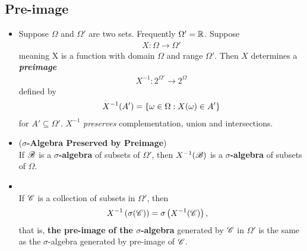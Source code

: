 \documentclass[11pt]{article}
\begin{document}
\subsection{Pre-image}
\begin{itemize}
\item \begin{remark}
Suppose $\Omega$ and $\Omega'$ are two sets. Frequently $\Omega' = {\mathbb R}$. Suppose
\begin{align*}
X: \Omega \rightarrow \Omega'
\end{align*}
meaning X is a function with domain $\Omega$ and range $\Omega'$. Then $X$ determines a \emph{\textbf{preimage}}
\begin{align*}
X^{-1}: 2^{\Omega'} \rightarrow 2^{\Omega}
\end{align*}
defined by
\begin{align*}
X^{-1}(A') = \left\{\omega \in \Omega: X(\omega) \in A'\right\}
\end{align*}
for $A' \subseteq \Omega'$. $X^{-1}$ \emph{preserves} complementation, union and intersections.
\end{remark}

\item \begin{proposition} (\textbf{$\sigma$-Algebra Preserved by Preimage}) \citep{resnick2013probability}\\
If ${\mathscr B}$ is a \textbf{$\sigma$-algebra} of subsets of $\Omega'$, then $X^{-1}({\mathscr B})$ is a \textbf{$\sigma$-algebra} of subsets of $\Omega$.
\end{proposition}

\item \begin{proposition}  \citep{resnick2013probability}\\
If ${\mathscr C}$ is a collection of subsets in $\Omega'$, then 
\begin{align*}
X^{-1}\left(\sigma({\mathscr C})\right) &= \sigma\left(X^{-1}({\mathscr C})\right),
\end{align*}
that is, \textbf{the pre-image of the $\sigma$-algebra} generated by ${\mathscr C}$ in $\Omega'$ is the same as the $\sigma$-algebra generated by pre-image of ${\mathscr C}$.  
\end{proposition}

\end{itemize}
\end{document}
